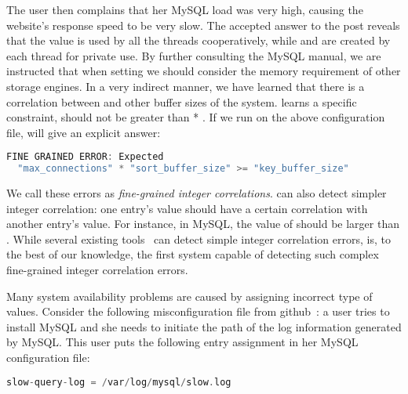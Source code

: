 The user then complains that her MySQL load was very high, 
causing the website's response speed to be very slow.
The accepted answer to the post reveals that the value  
is used by all the threads cooperatively, 
while  and  are created 
by each thread for private use.
By further consulting the MySQL manual, 
we are instructed that when setting  we should consider the memory requirement of other storage engines.
In a very indirect manner, we have learned that there is a correlation
between  and other buffer sizes of the system.
\app learns a specific constraint, \ie
{} should not be greater than
 * .
If we run \app on the above configuration file, \app will give an explicit answer:

\begin{lstlisting}[language=C, xleftmargin=.01\textwidth]
FINE GRAINED ERROR: Expected 
  "max_connections" * "sort_buffer_size" >= "key_buffer_size"
\end{lstlisting} 

We call these errors as {\em fine-grained integer correlations}. 
\app can also detect simpler integer correlation: one entry's
value should have a certain correlation with another entry's 
value.
For instance, in MySQL, the value of  
should be larger than .
While several existing tools~\cite{santolucitoCAV, zhang14encore}
can detect simple integer correlation errors,
\app is, to the best of our knowledge, the first system capable of
detecting such complex fine-grained integer correlation errors.

Many system availability problems are caused by 
assigning incorrect type of values. Consider the following  misconfiguration
file from github~\cite{typeerror}:
a user tries to install MySQL and she needs to initiate the path
of the log information generated by MySQL.
This user puts the following entry assignment in her MySQL
configuration file: 

\begin{lstlisting}[language=C, xleftmargin=.01\textwidth]
    slow-query-log = /var/log/mysql/slow.log
\end{lstlisting} 

